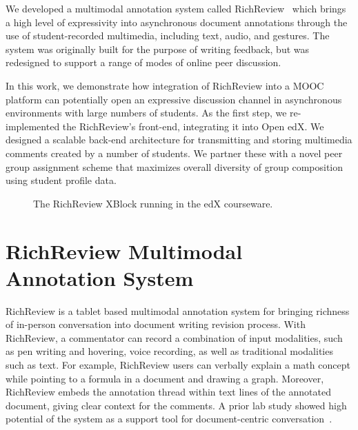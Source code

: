 \documentclass{sigchi}
\begin{document}
We developed a multimodal annotation system called RichReview~\cite{yoon2014richreview} which brings a high level of expressivity into asynchronous document annotations through the use of student-recorded multimedia, including text, audio, and gestures.
The system was originally built for the purpose of writing feedback, but was redesigned to support a range of modes of online peer discussion.

In this work, we demonstrate how integration of RichReview into a MOOC platform can potentially open an expressive discussion channel in asynchronous environments with large numbers of students.
As the first step, we re-implemented the RichReview's front-end, integrating it into Open edX. We designed a scalable back-end architecture for transmitting and storing multimedia comments created by a number of students.
We partner these with a novel peer group assignment scheme that maximizes overall diversity of group composition using student profile data.

\begin{figure}[!h]
\centering
{
\setlength{\fboxsep}{0pt}
\setlength{\fboxrule}{0.5pt}
}
\caption{The RichReview XBlock running in the edX courseware.}
\label{fig:screenshot}
\end{figure}


\section{RichReview Multimodal Annotation System}
RichReview is a tablet based multimodal annotation system for bringing richness of in-person conversation into document writing revision process.
With RichReview, a commentator can record a combination of input modalities, such as pen writing and hovering, voice recording, as well as traditional modalities such as text.
For example, RichReview users can verbally explain a math concept while pointing to a formula in a document and drawing a graph.
Moreover, RichReview embeds the annotation thread within text lines of the annotated document, giving clear context for the comments.
A prior lab study showed high potential of the system as a support tool for document-centric conversation~\cite{yoon2014richreview}.
\end{document}
